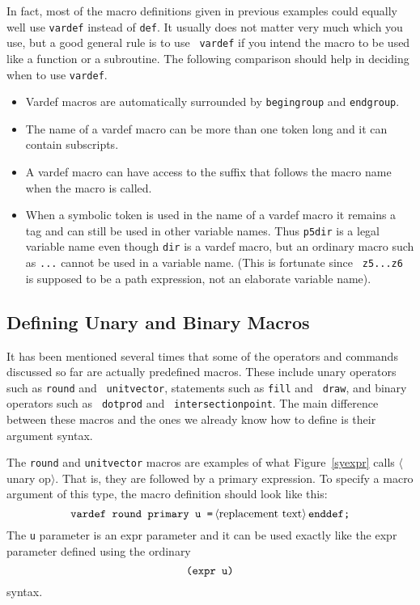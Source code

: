 \documentclass{article} %
\newcommand\descr[1]{{\langle\hbox{#1}\rangle}}
\newcommand\invisgap{\nobreak\hskip0pt\relax}
\newcommand\tdescr[1]{$\langle$\invisgap#1\invisgap$\rangle$}
\begin{document}
In fact, most of the macro definitions given in previous examples could
equally well use {\tt vardef} instead of {\tt def}.  It usually does not
matter very much which you use, but a good general rule is to use {\tt
vardef} if you intend the macro to be used like a function or a
subroutine.  The following comparison should help in deciding when to
use {\tt vardef}.

\begin{itemize}
\item Vardef macros are automatically surrounded by {\tt begingroup}
and {\tt endgroup}.
\item The name of a vardef macro can be more than one token long and it can
contain subscripts.
\item A vardef macro can have access to the suffix that follows the macro name
when the macro is called.
\item When a symbolic token is used in the name of a vardef macro it remains
a tag and can still be used in other variable names.  Thus
{\tt p5dir} is a legal variable name even though {\tt dir} is a vardef
macro, but an ordinary macro such as {\tt ...}
cannot be used in a variable name.  (This is fortunate since {\tt
z5...z6} is supposed to be a path expression, not an elaborate variable
name).
\end{itemize}


\subsection{Defining Unary and Binary Macros}

It has been mentioned several times that some of the operators and
commands discussed so far are actually predefined macros.  These include
unary operators such as {\tt round} and {\tt
unitvector}, statements such as
{\tt fill} and {\tt
draw}, and binary operators such as {\tt
dotprod} and {\tt
intersectionpoint}.
The main difference between these macros and the ones we already know
how to define is their argument syntax.

The {\tt round} and {\tt unitvector} macros are examples of what
Figure~\ref{syexpr} calls \tdescr{unary op}.  That is, they are followed
by a primary expression.  To specify a macro argument of this type, the
macro definition should look like this:
$$ \hbox{\tt vardef round primary u =}\, \descr{replacement text}\,
   \hbox{\tt enddef;}
$$
The {\tt u} parameter is an expr parameter and it can be
used exactly like the expr parameter defined using the ordinary
$$ \hbox{\tt (expr u)} $$
syntax.
\end{document}
